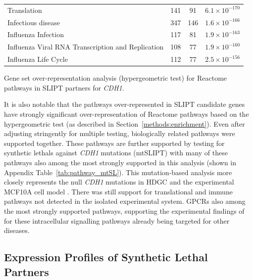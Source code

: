 \begin{table}[!ht]
{\begin{threeparttable}
\begin{tabular}{lccc}
  \rowcolor{black!5}
  Translation & 141 &  91 & $6.1 \times 10^{-170}$ \\ 
  \rowcolor{black!10}
  Infectious disease & 347 & 146 & $1.6 \times 10^{-166}$ \\ 
  \rowcolor{black!5}
  Influenza Infection & 117 &  81 & $1.9 \times 10^{-163}$ \\ 
  \rowcolor{black!10}
  Influenza Viral \acrshort{RNA} Transcription and Replication & 108 &  77 & $1.9 \times 10^{-160}$ \\ 
  \rowcolor{black!5}
  Influenza Life Cycle & 112 &  77 & $2.5 \times 10^{-156}$ \\ 
   \hline
\end{tabular}
\begin{tablenotes}
\raggedright %
Gene set over-representation analysis (hypergeometric test) for Reactome \glspl{pathway} in \gls{SLIPT} partners for \textit{CDH1}.
\end{tablenotes}
\end{threeparttable}
}
\end{table}

It is also notable that the \glspl{pathway} over-represented in \gls{SLIPT} candidate genes have strongly significant over-representation of Reactome \glspl{pathway} based on the hypergeometric test (as described in Section~\ref{methods:enrichment}). Even after adjusting stringently for multiple testing, biologically related \glspl{pathway} were supported together. These \glspl{pathway} are further supported by testing for \glspl{synthetic lethal} against \textit{CDH1} \glspl{mutation} (\acrshort{mtSLIPT}) with many of these \glspl{pathway} also among the most strongly supported in this analysis (shown in Appendix Table~\ref{tab:pathway_mtSL}). This \gls{mutation}-based analysis more closely represents the null \textit{CDH1} \glspl{mutation} in \gls{HDGC} \citep{Guilford1998} and the experimental MCF10A cell model \citep{Chen2014}. There was still support for translational and immune \glspl{pathway} not detected in the isolated experimental system.  \glspl{GPCR} also among the most strongly supported \glspl{pathway}, supporting the experimental findings of \citet{Telford2015} for these intracellular signalling \glspl{pathway} already being targeted for other diseases. 


\FloatBarrier


\subsection{Expression Profiles of Synthetic Lethal Partners} \label{chapt3:exprSL_clusters}

